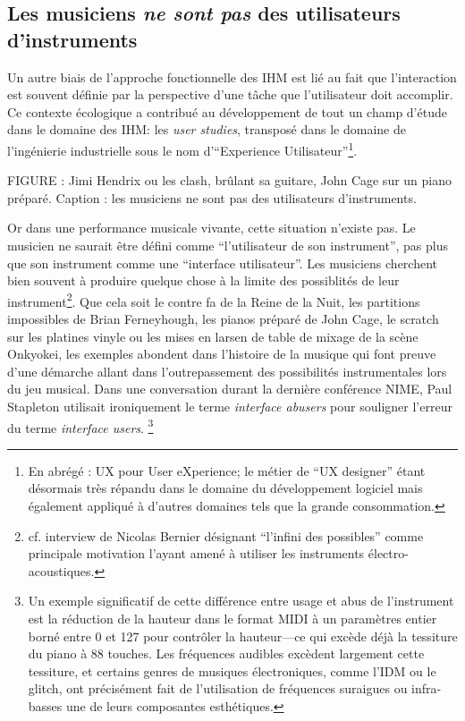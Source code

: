\subsection{Les musiciens \emph{ne sont pas} des utilisateurs d'instruments}

Un autre biais de l'approche fonctionnelle des IHM est lié au fait que l'interaction est souvent définie par la perspective d'une tâche que l'utilisateur doit accomplir. Ce contexte écologique a contribué au développement de tout un champ d'étude dans le domaine des IHM: les \textit{user studies}, transposé dans le domaine de l'ingénierie industrielle sous le nom d'``Experience Utilisateur''\footnote{En abrégé : UX pour User eXperience; le métier de ``UX designer'' étant désormais très répandu dans le domaine du développement logiciel mais également appliqué à d'autres domaines tels que la grande consommation.}.

FIGURE : Jimi Hendrix ou les clash, brûlant sa guitare, John Cage sur un piano préparé. Caption : les musiciens ne sont pas des utilisateurs d'instruments.

Or dans une performance musicale vivante, cette situation n'existe pas. Le musicien ne saurait être défini comme ``l'utilisateur de son instrument'', pas plus que son instrument comme une ``interface utilisateur''. Les musiciens cherchent bien souvent à produire quelque chose à la limite des possiblités de leur instrument\footnote{cf. interview de Nicolas Bernier désignant ``l'infini des possibles'' comme principale motivation l'ayant amené à utiliser les instruments électro-acoustiques.}. Que cela soit le contre fa de la Reine de la Nuit, les partitions impossibles de Brian Ferneyhough, les pianos préparé de John Cage, le scratch sur les platines vinyle ou les mises en larsen de table de mixage de la scène Onkyokei, les exemples abondent dans l'histoire de la musique qui font preuve d'une démarche allant dans l'outrepassement des possibilités instrumentales lors du jeu musical. Dans une conversation durant la dernière conférence NIME, Paul Stapleton utilisait ironiquement le terme \textit{interface abusers} pour souligner l'erreur du terme \textit{interface users}. \footnote{Un exemple significatif de cette différence entre usage et abus de l'instrument est la réduction de la hauteur dans le format MIDI à un paramètres entier borné entre 0 et 127 pour contrôler la hauteur—ce qui excède déjà la tessiture du piano à 88 touches. Les fréquences audibles excèdent largement cette tessiture, et certains genres de musiques électroniques, comme l'\gls{IDM} ou le \gls{glitch}, ont précisément fait de l'utilisation de fréquences suraigues ou infra-basses une de leurs composantes esthétiques.}


